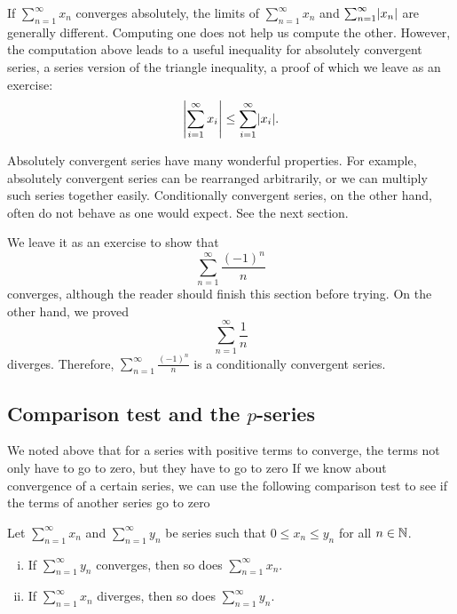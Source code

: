 If $\sum_{n=1}^\infty x_n$ converges absolutely, the limits of
$\sum_{n=1}^\infty x_n$ and $\sum_{n=1}^\infty \lvert {x_n} \rvert$ are generally different.  Computing one
does not help us compute the other.  However, the computation above leads to
a useful inequality for absolutely convergent series,
a series version of the triangle inequality,
a proof of which we leave as an exercise:
\begin{equation*}
\left\lvert { \sum_{i=1}^\infty x_i } \right\rvert
\leq
\sum_{i=1}^\infty \lvert {x_i} \rvert .
\end{equation*}

Absolutely convergent series have many wonderful properties.
For example, absolutely convergent
series can be rearranged arbitrarily, or we can multiply such
series together easily.  Conditionally convergent series,
on the other hand,
often do not behave as one would expect.  See the next section.

We leave it as an exercise to show that
\begin{equation*}
\sum_{n=1}^\infty \frac{{(-1)}^n}{n}
\end{equation*}
converges, although the reader should finish this section before trying.
On the other hand, we proved
\begin{equation*}
\sum_{n=1}^\infty \frac{1}{n}
\end{equation*}
diverges.  Therefore,
$\sum_{n=1}^\infty \frac{{(-1)}^n}{n}$ is a conditionally convergent series.

\subsection{Comparison test and the \texorpdfstring{$p$}{p}-series}

We noted above that for a series with positive terms to converge,
the terms not only have to go to zero, but they have to go to zero
  If we know about convergence of a certain series,
we can use the following comparison test to see if the terms of another
series go to zero 

\begin{samepage}
\begin{prop}
Let $\sum_{n=1}^\infty x_n$ and $\sum_{n=1}^\infty y_n$ be series such that $0 \leq x_n \leq y_n$
for all $n \in {\mathbb{N}}$.
\begin{enumerate}[(i)]
\item If $\sum_{n=1}^\infty y_n$ converges, then so does $\sum_{n=1}^\infty x_n$.
\item If $\sum_{n=1}^\infty x_n$ diverges, then so does $\sum_{n=1}^\infty y_n$.
\end{enumerate}
\end{prop}
\end{samepage}

